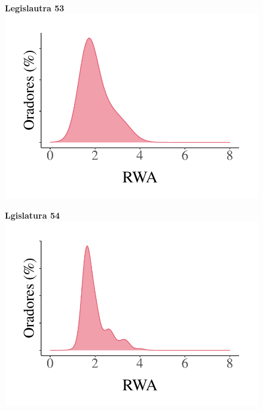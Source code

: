 \documentclass[
12pt,				%
openright,			%
twoside,			%
a4paper,			%
english,			%
french,				%
spanish,			%
brazil				%
]{abntex2}
\begin{document}
\begin{figure}[!htb]
\begin{minipage}[b]{0.3\textwidth}
	\end{minipage}
	\\
	\hspace{.05\linewidth}
	\begin{minipage}[b]{0.3\textwidth}
		\textbf{Legislautra 53}
		\label{fig:dense_rwa_53}
		\centering
		\includegraphics[width=1\linewidth]{figures/dense_rwa_53}
		
	\end{minipage}
	\hspace{.05\linewidth}
	\begin{minipage}[b]{0.3\textwidth}
		\textbf{Lgislatura 54}
		\label{fig:dense_rwa_54}
		\centering
		\includegraphics[width=1\linewidth]{figures/dense_rwa_54}
		

\end{minipage}
\end{figure}
\end{document}
